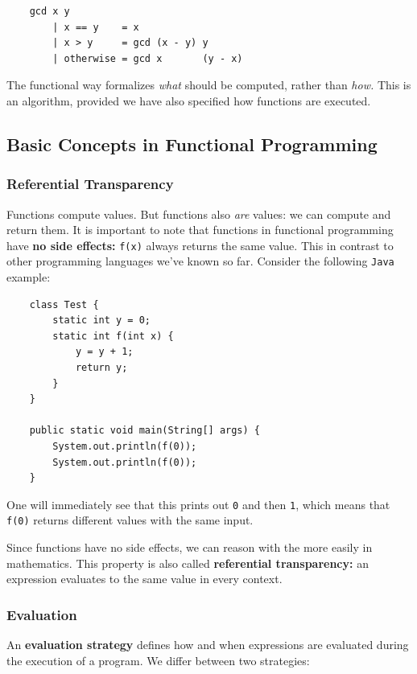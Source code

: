 \documentclass[a4paper]{extarticle}
\begin{document}
\begin{verbatim}
    gcd x y
        | x == y    = x
        | x > y     = gcd (x - y) y
        | otherwise = gcd x       (y - x)
\end{verbatim}

The functional way formalizes \textit{what} should be computed, rather than \textit{how.} This is an algorithm, provided we have also specified how functions are executed.

\subsection{Basic Concepts in Functional Programming}

\subsubsection{Referential Transparency}

Functions compute values. But functions also \textit{are} values: we can compute and return them. It is important to note that functions in functional programming have \textbf{no side effects:} \verb|f(x)| always returns the same value. This in contrast to other programming languages we've known so far. Consider the following \verb|Java| example:

\begin{verbatim}
    class Test {
        static int y = 0;
        static int f(int x) {
            y = y + 1;
            return y;
        }
    }

    public static void main(String[] args) {
        System.out.println(f(0));
        System.out.println(f(0));
    }
\end{verbatim}

One will immediately see that this prints out \verb|0| and then \verb|1|, which means that \verb|f(0)| returns different values with the same input.

Since functions have no side effects, we can reason with the more easily in mathematics. This property is also called \textbf{referential transparency:} an expression evaluates to the same value in every context.

\subsubsection{Evaluation}

An \textbf{evaluation strategy} defines how and when expressions are evaluated during the execution of a program. We differ between two strategies:
\end{document}
